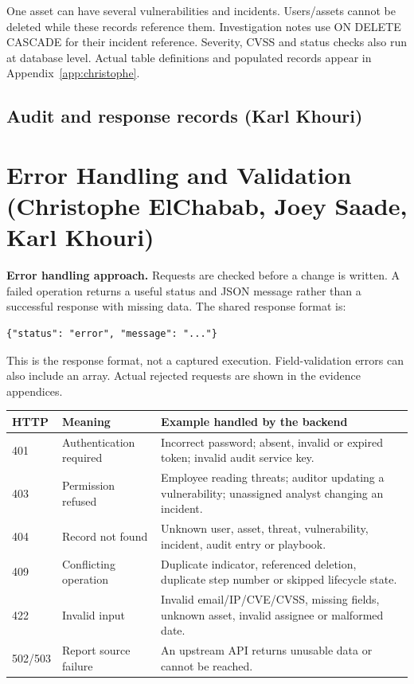 \documentclass[11pt,a4paper]{article}
\begin{document}
One asset can have several vulnerabilities and incidents. Users/assets cannot be deleted while these records reference them. Investigation notes use ON DELETE CASCADE for their incident reference. Severity, CVSS and status checks also run at database level. Actual table definitions and populated records appear in Appendix~\ref{app:christophe}.

\subsection{Audit and response records (Karl Khouri)}


\section{Error Handling and Validation (Christophe ElChabab, Joey Saade, Karl Khouri)}
\label{sec:validation}
\textbf{Error handling approach.} Requests are checked before a change is written. A failed operation returns a useful status and JSON message rather than a successful response with missing data. The shared response format is:
\begin{lstlisting}
{"status": "error", "message": "..."}
\end{lstlisting}
This is the response format, not a captured execution. Field-validation errors can also include an  array. Actual rejected requests are shown in the evidence appendices.

\begin{small}\begin{tabularx}{\linewidth}{@{}p{16mm}p{35mm}X@{}}
\toprule\textbf{HTTP} & \textbf{Meaning} & \textbf{Example handled by the backend}\\\midrule
401 & Authentication required & Incorrect password; absent, invalid or expired token; invalid audit service key.\\
403 & Permission refused & Employee reading threats; auditor updating a vulnerability; unassigned analyst changing an incident.\\
404 & Record not found & Unknown user, asset, threat, vulnerability, incident, audit entry or playbook.\\
409 & Conflicting operation & Duplicate indicator, referenced deletion, duplicate step number or skipped lifecycle state.\\
422 & Invalid input & Invalid email/IP/CVE/CVSS, missing fields, unknown asset, invalid assignee or malformed date.\\
502/503 & Report source failure & An upstream API returns unusable data or cannot be reached.\\\bottomrule
\end{tabularx}\end{small}
\end{document}
